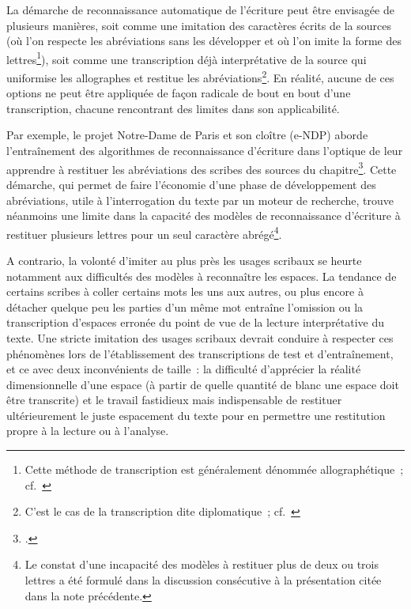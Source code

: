 \documentclass[a4paper,12pt,twoside]{book}
\begin{document}
				La démarche de reconnaissance automatique de l'écriture peut être envisagée de plusieurs manières, soit comme une imitation des caractères écrits de la sources (où l'on respecte les abréviations sans les développer et où l'on imite la forme des lettres\footnote{Cette méthode de transcription est généralement dénommée allographétique~; cf.~\cite[p.~250 \textit{et passim}]{stutzmannPaleographieStatistiquePour2011a}}), soit comme une transcription déjà interprétative de la source qui uniformise les allographes et restitue les abréviations\footnote{C'est le cas de la transcription dite diplomatique~; cf.~\cite{guyotjeanninDiplomatiqueMedievale2006}}. En réalité, aucune de ces options ne peut être appliquée de façon radicale de bout en bout d'une transcription, chacune rencontrant des limites dans son applicabilité.
				
				Par exemple, le projet Notre-Dame de Paris et son cloître (e-NDP) aborde l'entraînement des algorithmes de reconnaissance d'écriture dans l'optique de leur apprendre à restituer les abréviations des scribes des sources du chapitre\footcite{torresaguilarENDPNotreDameParis2022}. Cette démarche, qui permet de faire l'économie d'une phase de développement des abréviations, utile à l'interrogation du texte par un moteur de recherche, trouve néanmoins une limite dans la capacité des modèles de reconnaissance d'écriture à restituer plusieurs lettres pour un seul caractère abrégé\footnote{Le constat d'une incapacité des modèles à restituer plus de deux ou trois lettres a été formulé dans la discussion consécutive à la présentation citée dans la note précédente.}.
				
				A contrario, la volonté d'imiter au plus près les usages scribaux se heurte notamment aux difficultés des modèles à reconnaître les espaces. La tendance de certains scribes à coller certains mots les uns aux autres, ou plus encore à détacher quelque peu les parties d'un même mot entraîne l'omission ou la transcription d'espaces erronée du point de vue de la lecture interprétative du texte. Une stricte imitation des usages scribaux devrait conduire à respecter ces phénomènes lors de l'établissement des transcriptions de test et d'entraînement, et ce avec deux inconvénients de taille~: la difficulté d'apprécier la réalité dimensionnelle d'une espace (à partir de quelle quantité de blanc une espace doit être transcrite) et le travail fastidieux mais indispensable de restituer ultérieurement le juste espacement du texte pour en permettre une restitution propre à la lecture ou à l'analyse.
				
\end{document}
